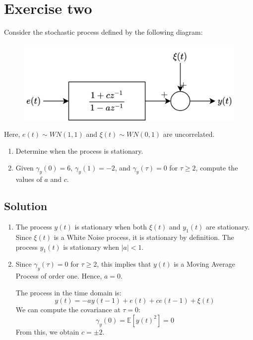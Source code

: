 \section{Exercise two}

Consider the stochastic process defined by the following diagram:
\begin{figure}[H]
    \centering
    \includegraphics[width=0.5\linewidth]{images/block1.png}
\end{figure}
Here, $e(t) \sim WN(1,1)$ and $\xi(t) \sim WN(0,1)$ are uncorrelated.
\begin{enumerate}
    \item Determine when the process is stationary.
    \item Given $\gamma_y(0)=6$, $\gamma_y(1)=-2$, and $\gamma_y(\tau)=0$ for $\tau \geq 2$, compute the values of $a$ and $c$.
\end{enumerate}

\subsection*{Solution}
\begin{enumerate}
    \item The process $y(t)$ is stationary when both $\xi(t)$ and $y_1(t)$ are stationary.
        Since $\xi(t)$ is a White Noise process, it is stationary by definition.
        The process $y_1(t)$ is stationary when $\left\lvert a \right\rvert<1$.
    \item Since $\gamma_y(\tau)=0$ for $\tau \geq 2$, this implies that $y(t)$ is a Moving Average Process of order one.
        Hence, $a=0$.

        The process in the time domain is: 
        \[y(t)=-ay(t-1)+e(t)+ce(t-1)+\xi(t)\]
        We can compute the covariance at $\tau=0$:
        \[\gamma_y(0)=\mathbb{E}\left[ {y(t)}^2 \right]=0\]
        From this, we obtain $c=\pm 2$. 
\end{enumerate}